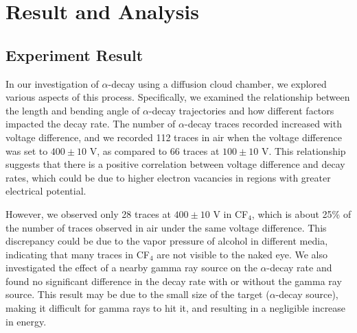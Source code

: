 \documentclass[a4paper]{tufte-handout}
\begin{document}
\newpage
\section{Result and Analysis}
\subsection{Experiment Result}
In our investigation of $\alpha$-decay using a diffusion cloud chamber, we explored various aspects of this process. Specifically, we examined the relationship between the length and bending angle of $\alpha$-decay trajectories and how different factors impacted the decay rate. The number of $\alpha$-decay traces recorded increased with voltage difference, and we recorded 112 traces in air when the voltage difference was set to $400\pm10$ V, as compared to 66 traces at $100\pm10$ V. This relationship suggests that there is a positive correlation between voltage difference and decay rates, which could be due to higher electron vacancies in regions with greater electrical potential.

However, we observed only 28 traces at $400\pm10$ V in CF$_4$, which is about 25\% of the number of traces observed in air under the same voltage difference. This discrepancy could be due to the vapor pressure of alcohol in different media, indicating that many traces in CF$_4$ are not visible to the naked eye. We also investigated the effect of a nearby gamma ray source on the $\alpha$-decay rate and found no significant difference in the decay rate with or without the gamma ray source. This result may be due to the small size of the target ($\alpha$-decay source), making it difficult for gamma rays to hit it, and resulting in a negligible increase in energy.
\end{document}
